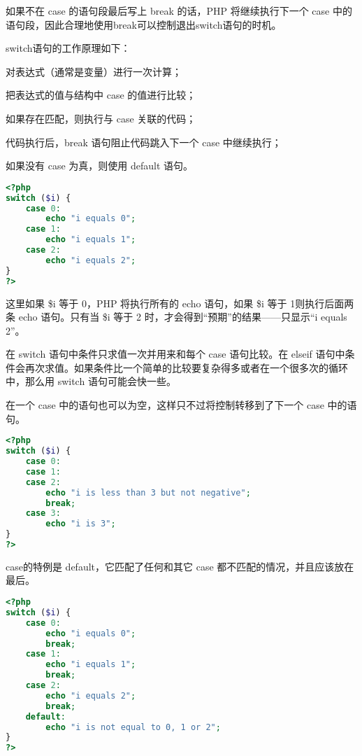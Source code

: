 如果不在 case 的语句段最后写上 break 的话，PHP 将继续执行下一个 case 中的语句段，因此合理地使用break可以控制退出switch语句的时机。


switch语句的工作原理如下：

\begin{compactenum}
\item 对表达式（通常是变量）进行一次计算；
\item 把表达式的值与结构中 case 的值进行比较；
\item 如果存在匹配，则执行与 case 关联的代码；
\item 代码执行后，break 语句阻止代码跳入下一个 case 中继续执行；
\item 如果没有 case 为真，则使用 default 语句。
\end{compactenum}




\begin{lstlisting}[language=PHP]
<?php
switch ($i) {
    case 0:
        echo "i equals 0";
    case 1:
        echo "i equals 1";
    case 2:
        echo "i equals 2";
}
?>
\end{lstlisting}

这里如果 \$i 等于 0，PHP 将执行所有的 echo 语句，如果 \$i 等于 1则执行后面两条 echo 语句。只有当 \$i 等于 2 时，才会得到“预期”的结果——只显示“i equals 2”。

在 switch 语句中条件只求值一次并用来和每个 case 语句比较。在 elseif 语句中条件会再次求值。如果条件比一个简单的比较要复杂得多或者在一个很多次的循环中，那么用 switch 语句可能会快一些。

在一个 case 中的语句也可以为空，这样只不过将控制转移到了下一个 case 中的语句。

\begin{lstlisting}[language=PHP]
<?php
switch ($i) {
    case 0:
    case 1:
    case 2:
        echo "i is less than 3 but not negative";
        break;
    case 3:
        echo "i is 3";
}
?>
\end{lstlisting}


case的特例是 default，它匹配了任何和其它 case 都不匹配的情况，并且应该放在最后。

\begin{lstlisting}[language=PHP]
<?php
switch ($i) {
    case 0:
        echo "i equals 0";
        break;
    case 1:
        echo "i equals 1";
        break;
    case 2:
        echo "i equals 2";
        break;
    default:
        echo "i is not equal to 0, 1 or 2";
}
?>
\end{lstlisting}

